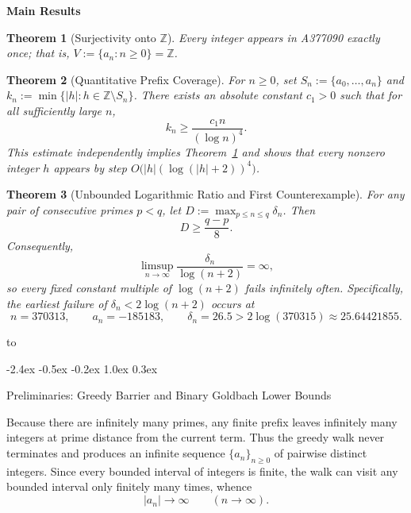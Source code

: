 \documentclass[11pt,a4paper]{article}
\makeatletter
\renewcommand{\section}{\@startsection{section}{1}{\z@}%
  {-2.4ex \@plus -0.5ex \@minus -0.2ex}%
  {1.0ex \@plus 0.3ex}%
  {\Large\bfseries\sffamily\color{ink}\raggedright}}
\theoremstyle{entheorem}
\newtheorem{theorem}{Theorem}
\theoremstyle{enremark}
\newenvironment{accentbox}[1]{%
  \par\vspace{0.45em}\noindent
  \begin{lrbox}{\accentstore}%
    \begin{minipage}{\dimexpr\linewidth-23pt\relax}%
      \vspace{8pt}%
      \setlength{\parskip}{0.45em}%
      {\normalsize\bfseries\sffamily\color{ink}#1}\par\vspace{2pt}%
}{%
      \vspace{8pt}%
    \end{minipage}%
  \end{lrbox}%
  \setlength{\fboxsep}{0pt}%
  \colorbox{boxbg}{%
    \hbox to \linewidth{%
      {\color{ink}\vrule width 3pt}%
      \hspace{10pt}%
      \usebox{\accentstore}%
      \hspace{10pt}%
    }%
  }%
  \par\vspace{0.55em}%
}
\newcommand{\Z}{\mathbb{Z}}
\newcommand{\de}{\delta}
\makeatother
\begin{document}
\begin{accentbox}{Main Results}
\begin{theorem}[Surjectivity onto $\Z$]\label{thm:ergodic}
Every integer appears in \textup{A377090} exactly once; that is, $V := \{a_n : n \ge 0\} = \Z$.
\end{theorem}

\begin{theorem}[Quantitative Prefix Coverage]\label{thm:prefix}
For $n \ge 0$, set $S_n := \{a_0, \ldots, a_n\}$ and $k_n := \min\{|h| : h \in \Z \setminus S_n\}$. There exists an absolute constant $c_1 > 0$ such that for all sufficiently large $n$,
\begin{equation}\label{eq:kn-bound}
  k_n \ge \frac{c_1 n}{(\log n)^4}.
\end{equation}
This estimate independently implies Theorem~\ref{thm:ergodic} and shows that every nonzero integer $h$ appears by step $O\bigl(|h|(\log(|h|+2))^4\bigr)$.
\end{theorem}

\begin{theorem}[Unbounded Logarithmic Ratio and First Counterexample]\label{thm:gap}
For any pair of consecutive primes $p < q$, let $D := \max_{p \le n \le q}\de_n$. Then
\begin{equation}\label{eq:gap-lower}
  D \ge \frac{q-p}{8}.
\end{equation}
Consequently,
\[
  \limsup_{n\to\infty}\frac{\de_n}{\log(n+2)} = \infty,
\]
so every fixed constant multiple of $\log(n+2)$ fails infinitely often. Specifically, the earliest failure of $\de_n < 2\log(n+2)$ occurs at
\[
  n = 370313,\qquad a_n = -185183,\qquad \de_n = 26.5 > 2\log(370315) \approx 25.64421855.
\]
\end{theorem}
\end{accentbox}

\section{Preliminaries: Greedy Barrier and Binary Goldbach Lower Bounds}

Because there are infinitely many primes, any finite prefix leaves infinitely many integers at prime distance from the current term. Thus the greedy walk never terminates and produces an infinite sequence $\{a_n\}_{n \ge 0}$ of pairwise distinct integers. Since every bounded interval of integers is finite, the walk can visit any bounded interval only finitely many times, whence
\[
  |a_n| \longrightarrow \infty \qquad (n \to \infty).
\]
\end{document}
